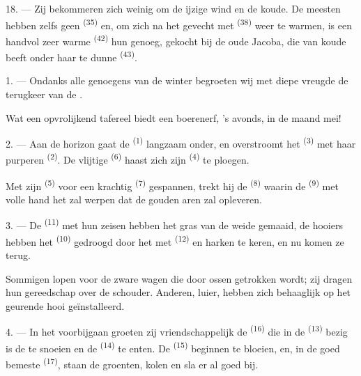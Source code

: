 18. --- Zij bekommeren zich weinig om de ijzige wind en de koude. De meesten hebben zelfs geen
 \textsuperscript{(35)} en, om zich na het gevecht met 
\textsuperscript{(38)} weer te warmen, is een handvol zeer warme 
\textsuperscript{(42)} hun genoeg, gekocht bij de oude  Jacoba, die van
koude beeft onder haar te dunne
 \textsuperscript{(43)}.

\VUsaut{3.0mm}
\VUsaut{3.0mm}

\VUsaut{4.0mm}

1. --- Ondanks alle genoegens van de winter begroeten wij met diepe vreugde de terugkeer van
de .

Wat een opvrolijkend tafereel biedt een boerenerf, 's avonds, in de maand mei!

2. --- Aan de horizon gaat de  \textsuperscript{(1)} langzaam onder, en
overstroomt het  \textsuperscript{(3)} met haar purperen
 \textsuperscript{(2)}. De vlijtige 
\textsuperscript{(6)} haast zich zijn  \textsuperscript{(4)} te ploegen.

Met zijn  \textsuperscript{(5)} voor een krachtig 
\textsuperscript{(7)} gespannen, trekt hij de  \textsuperscript{(8)} waarin de
 \textsuperscript{(9)} met volle hand het  zal werpen dat de
gouden aren zal opleveren.

3. --- De  \textsuperscript{(11)} met hun zeisen hebben het gras van de weide
gemaaid, de hooiers hebben het  \textsuperscript{(10)} gedroogd door het met
 \textsuperscript{(12)} en harken te keren, en nu komen ze terug.

Sommigen lopen voor de zware wagen die door ossen getrokken wordt; zij dragen hun gereedschap
over de schouder. Anderen, luier, hebben zich behaaglijk op het geurende hooi geïnstalleerd.

4. --- In het voorbijgaan groeten zij vriendschappelijk de 
\textsuperscript{(16)} die in de  \textsuperscript{(13)} bezig is de
 te snoeien en de  \textsuperscript{(14)} te enten. De
 \textsuperscript{(15)} beginnen te bloeien, en, in de goed bemeste
 \textsuperscript{(17)}, staan de groenten, kolen en sla er al
goed bij.

